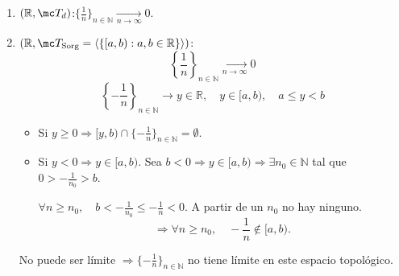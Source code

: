 \begin{ejem}
    \hfill
    \begin{enumerate}
        \item \((\mathbb{R}, \mc T_d)\):\quad \(\{\frac{1}{n}\}_{n \in \mathbb{N}} \xrightarrow[n \to \infty]{} 0\).
        
        \item \((\mathbb{R}, \mc T_{\text{Sorg}} = \langle \{ [a, b) : a, b \in \mathbb{R} \} \rangle)\):
        \[
            \left\{\frac{1}{n}\right\}_{n \in \mathbb{N}} \xrightarrow[n \to \infty]{} 0
        \]
        \[
            \left\{-\frac{1}{n}\right\}_{n \in \mathbb{N}} \longrightarrow y \in \mathbb{R}, \quad y \in [a,b), \quad a \le y < b
        \]
        \begin{itemize}
            \item Si \(y \ge 0 \Rightarrow [y, b) \cap \{-\frac{1}{n}\}_{n \in \mathbb{N}} = \emptyset\).
            
            \item Si \(y < 0 \Rightarrow y \in [a,b)\). Sea \(b < 0 \Rightarrow y \in [a, b) \Rightarrow \exists n_0 \in \mathbb{N}\) tal que $0 > -\frac{1}{n_0} > b$.
            
            \begin{center}
            \end{center}
            \(\forall n \ge n_0, \quad b < - \frac{1}{n_0} \le - \frac{1}{n} < 0\). A partir de un \(n_0\) no hay ninguno.
            \[
                \Rightarrow \forall n \ge n_0, \quad -\frac{1}{n} \notin [a, b).
            \]
        \end{itemize}
        No puede ser límite \(\Rightarrow \{-\frac{1}{n}\}_{n \in \mathbb{N}}\) no tiene límite en este espacio topológico.
        

\end{enumerate}
\end{ejem}
